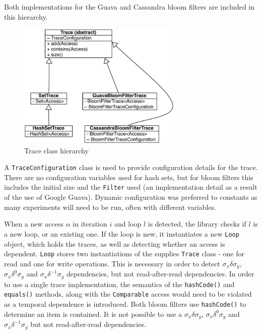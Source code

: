 		Both implementations for the Guava and Cassandra bloom filters are included in this hierarchy.
		
		\begin{figure}
			\centering
			\includegraphics[width=0.7\textwidth]{graphics/trace-classes.pdf}
			\caption{Trace class hierarchy}
			\label{fig:trace-classes}
		\end{figure}
		
		A \texttt{TraceConfiguration} class is used to provide configuration details for the trace. There are no configuration variables used for hash sets, but for bloom filters this includes the initial size and the \texttt{Filter} used (an implementation detail as a result of the use of Google Guava). Dynamic configuration was preferred to constants as many experiments will need to be run, often with different variables.
		
		When a new access $\alpha$ in iteration $i$ and loop $l$ is detected, the library checks if $l$ is a new loop, or an existing one. If the loop is new, it instantiates a new \texttt{Loop} object, which holds the traces, as well as detecting whether an access is dependent. \texttt{Loop} stores two instantiations of the supplies \texttt{Trace} class - one for read and one for write operations. This is necessary in order to detect $\sigma_x \delta \sigma_y$, $\sigma_x \delta^0 \sigma_y$ and $\sigma_x \delta^{-1} \sigma_y$ dependencies, but not read-after-read dependencies. In order to use a single trace implementation, the semantics of the \texttt{hashCode()} and \texttt{equals()} methods, along with the \texttt{Comparable} access would need to be violated as a temporal dependence is introduced. Both bloom filters use \texttt{hashCode()} to determine an item is contained. It is not possible to use a $\sigma_x \delta \sigma_y$, $\sigma_x \delta^0 \sigma_y$ and $\sigma_x \delta^{-1} \sigma_y$ but not read-after-read dependencies.
		
